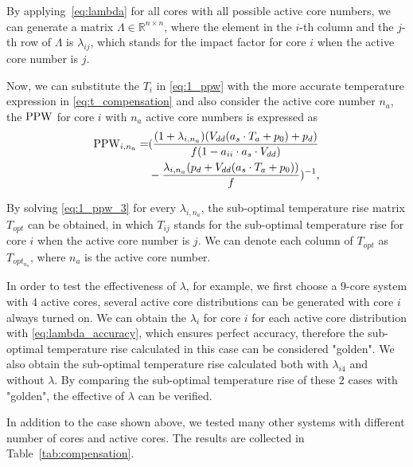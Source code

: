 By applying~\eqref{eq:lambda} for all cores with all possible active core
numbers, we can generate a matrix $\Lambda \in \mathbb{R}^{n\times
  n}$, where the element in the $i$-th column and the $j$-th row of
$\Lambda$ is $\lambda_{ij}$, which stands for the impact factor for
core $i$ when the active core number is $j$.

Now, we can substitute the $T_{i}$
in \eqref{eq:1_ppw} with the more accurate temperature expression in
\eqref{eq:t_compensation} and also consider the active core number
$n_a$, the $\operatorname{PPW}$ for core $i$ with $n_a$ active core numbers is
expressed as
\begin{equation}\label{eq:1_ppw_3}
\begin{split}
\ppw_{i,n_a} =& ( \frac{(1+\lambda_{i,n_a})(V_{dd}(a_{s}\cdot T_{a}+p_{0})+p_{d})}{f(1-a_{ii} \cdot a_{s} \cdot V_{dd})}\\
&-\frac{\lambda_{i,n_a} (p_{d}+V_{dd}(a_{s}\cdot T_{a}+p_{0}))}{f} ) ^{-1},
\end{split}
\end{equation}

By solving \eqref{eq:1_ppw_3} for every $\lambda_{i,n_a}$, the sub-optimal temperature rise matrix $T_{opt}$ can be obtained, in which $T_{ij}$ stands for the sub-optimal temperature rise for core $i$ when the active core number is $j$. We can denote each column of $T_{opt}$ as $T_{opt_{n_{a}}}$, where $n_{a}$ is the active core number. 

In order to test the effectiveness of $\lambda$, for example, we first choose a $9$-core system with $4$ active cores, several active core distributions can be generated with core $i$ always turned on. We can obtain the $\lambda_{i}$ for core $i$ for each active core distribution with \eqref{eq:lambda_accuracy}, which ensures perfect accuracy, therefore the sub-optimal temperature rise calculated in this case can be considered "golden". We also obtain the sub-optimal temperature rise calculated both with $\lambda_{i4}$ and without $\lambda$. By comparing the sub-optimal temperature rise of these $2$ cases with "golden", the effective of $\lambda$ can be verified.

In addition to the case shown above, we tested many other systems with different number of cores and active cores. The results are collected in Table~\ref{tab:compensation}.

